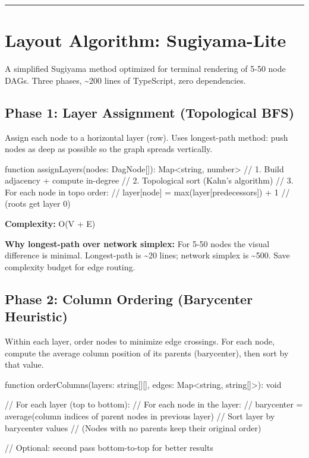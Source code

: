 \begin{center}\rule{0.5\linewidth}{0.5pt}\end{center}

\section{Layout Algorithm: Sugiyama-Lite}\label{record-426-layout-algorithm-sugiyama-lite}

A simplified Sugiyama method optimized for terminal rendering of 5-50 node DAGs. Three phases, \textasciitilde200 lines of TypeScript, zero dependencies.

\subsection{Phase 1: Layer Assignment (Topological BFS)}\label{record-426-phase-1-layer-assignment-topological-bfs}

Assign each node to a horizontal layer (row). Uses longest-path method: push nodes as deep as possible so the graph spreads vertically.

\begin{CodeBlock}
function assignLayers(nodes: DagNode[]): Map<string, number> {
  // 1. Build adjacency + compute in-degree
  // 2. Topological sort (Kahn's algorithm)
  // 3. For each node in topo order:
  //    layer[node] = max(layer[predecessors]) + 1
  //    (roots get layer 0)
}
\end{CodeBlock}

\textbf{Complexity:} O(V + E)

\textbf{Why longest-path over network simplex:} For 5-50 nodes the visual difference is minimal. Longest-path is \textasciitilde20 lines; network simplex is \textasciitilde500. Save complexity budget for edge routing.

\subsection{Phase 2: Column Ordering (Barycenter Heuristic)}\label{record-426-phase-2-column-ordering-barycenter-heuristic}

Within each layer, order nodes to minimize edge crossings. For each node, compute the average column position of its parents (barycenter), then sort by that value.

\begin{CodeBlock}
function orderColumns(layers: string[][], edges: Map<string, string[]>): void {
  // For each layer (top to bottom):
  //   For each node in the layer:
  //     barycenter = average(column indices of parent nodes in previous layer)
  //   Sort layer by barycenter values
  //   (Nodes with no parents keep their original order)

  // Optional: second pass bottom-to-top for better results
}
\end{CodeBlock}

